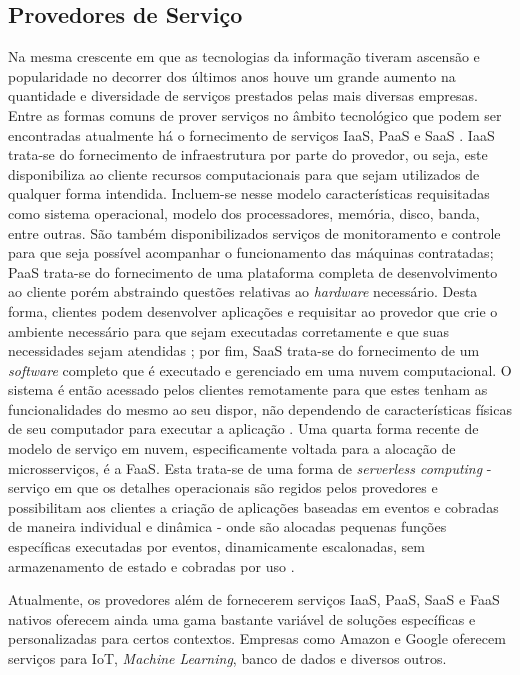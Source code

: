 \subsection{Provedores de Serviço}

Na mesma crescente em que as tecnologias da informação tiveram ascensão e popularidade no decorrer dos últimos anos houve um grande aumento na quantidade e diversidade de serviços prestados pelas mais diversas empresas. Entre as formas comuns de prover serviços no âmbito tecnológico que podem ser encontradas atualmente há o fornecimento de serviços \ac{IaaS}, \ac{PaaS} e \ac{SaaS} \cite{nuvem_sla:nist_cloud}. \ac{IaaS} trata-se do fornecimento de infraestrutura por parte do provedor, ou seja, este disponibiliza ao cliente recursos computacionais para que sejam utilizados de qualquer forma intendida. Incluem-se nesse modelo características requisitadas como sistema operacional, modelo dos processadores, memória, disco, banda, entre outras. São também disponibilizados serviços de monitoramento e controle para que seja possível acompanhar o funcionamento das máquinas contratadas; \ac{PaaS} trata-se do fornecimento de uma plataforma completa de desenvolvimento ao cliente porém abstraindo questões relativas ao \textit{hardware} necessário. Desta forma, clientes podem desenvolver aplicações e requisitar ao provedor que crie o ambiente necessário para que sejam executadas corretamente e que suas necessidades sejam atendidas \cite{nuvem_sla:cloud_native_inf}; por fim, \ac{SaaS} trata-se do fornecimento de um \textit{software} completo que é executado e gerenciado em uma nuvem computacional. O sistema é então acessado pelos clientes remotamente para que estes tenham as funcionalidades do mesmo ao seu dispor, não dependendo de características físicas de seu computador para executar a aplicação \cite{nuvem_sla:saas}. Uma quarta forma recente de modelo de serviço em nuvem, especificamente voltada para a alocação de microsserviços, é a \ac{FaaS}. Esta trata-se de uma forma de \textit{serverless computing} - serviço em que os detalhes operacionais são regidos pelos provedores e possibilitam aos clientes a criação de aplicações baseadas em eventos e cobradas de maneira individual e dinâmica - onde são alocadas pequenas funções específicas executadas por eventos, dinamicamente escalonadas, sem armazenamento de estado e cobradas por uso \cite{nuvem_sla:faas}.

Atualmente, os provedores além de fornecerem serviços \ac{IaaS}, \ac{PaaS}, \ac{SaaS} e \ac{FaaS} nativos oferecem ainda uma gama bastante variável de soluções específicas e personalizadas para certos contextos. Empresas como Amazon \cite{nuvem_sla:produtos_amazon} e Google \cite{nuvem_sla:produtos_google} oferecem serviços para \ac{IoT}, \textit{Machine Learning}, banco de dados e diversos outros.

